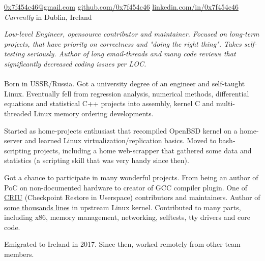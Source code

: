 \documentclass[10pt,a4paper,final,oneside,notitlepage]{article}
\begin{document}
\sloppy

\nobreakvspace{0.3em}

\noindent
\href{mailto:0x7f454c46.at.gmail.com}{0x7f454c46\mbox{}@\mbox{}gmail.com}\sbull
\href{https://github.com/0x7f454c46}{github.com/0x7f454c46}\sbull
\href{http://linkedin.com/in/0x7f454c46}{linkedin.com/in/0x7f454c46}
\\
\emph{Currently } in Dublin, Ireland

\spacedhrule{0.9em}{-0.4em}

\vspace{-1.3em}
\begin{multicols}{2}
\noindent \emph{Low-level Engineer, opensource contributor and maintainer.
Focused on long-term projects, that have priority on correctness and
"doing the right thing". Takes self-testing seriously. Author of long
email-threads and many code reviews that significantly decreased coding
issues per LOC.}
\\
\\
Born in USSR/Russia. Got a university degree of an engineer
and self-taught Linux. Eventually fell from regression analysis,
numerical methods, differential equations and statistical C++ projects
into assembly, kernel C and multi-threaded Linux memory ordering developments.

Started as home-projects enthusiast that recompiled OpenBSD kernel
on a home-server and learned Linux virtualization/replication basics.
Moved to bash-scripting projects, including a home web-scrapper that gathered
some data and statistics (a scripting skill that was very handy since then).

Got a chance to participate in many wonderful projects. From being an author
of PoC on non-documented hardware to creator of GCC compiler plugin.
One of \href{https://github.com/checkpoint-restore/criu}{CRIU}
(Checkpoint Restore in Userspace) contributors and maintainers.
Author of \href{https://git.kernel.org/pub/scm/linux/kernel/git/next/linux-next.git/log/?qt=author&q=Dmitry+Safonov}{some thousands lines}
in upstream Linux kernel. Contributed to many parts, including x86,
memory management, networking, selftests, tty drivers and core code.

Emigrated to Ireland in 2017.
Since then, worked remotely from other team members.


\end{multicols}
\end{document}
